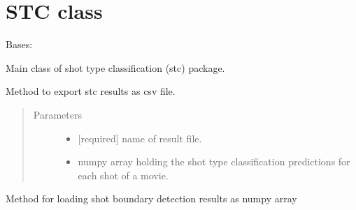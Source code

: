 \documentclass[letterpaper,10pt,english,openany,oneside]{sphinxmanual}
\begin{document}
\section{STC class}
\label{\detokenize{STC:stc-class}}\label{\detokenize{STC::doc}}

\begin{fulllineitems}
\label{\detokenize{STC:stc.STC.STC}}
Bases: 

Main class of shot type classification (stc) package.

\begin{fulllineitems}
\label{\detokenize{STC:stc.STC.STC.exportStcResults}}
Method to export stc results as csv file.
\begin{quote}\begin{description}
\item[{Parameters}] \leavevmode\begin{itemize}
\item {} 
 \textendash{} {[}required{]} name of result file.

\item {} 
 \textendash{} numpy array holding the shot type classification predictions for each shot of a movie.

\end{itemize}

\end{description}\end{quote}

\end{fulllineitems}


\begin{fulllineitems}
\label{\detokenize{STC:stc.STC.STC.loadSbdResults}}
Method for loading shot boundary detection results as numpy array


\end{fulllineitems}
\end{fulllineitems}
\end{document}
